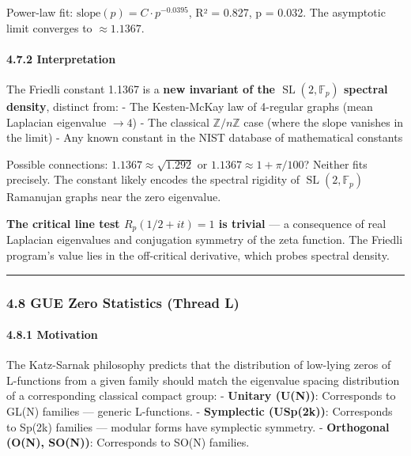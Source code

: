 \documentclass[
]{article}
\begin{document}
Power-law fit: \(\text{slope}(p) = C \cdot p^{-0.0395}\), R² = 0.827, p
= 0.032. The asymptotic limit converges to \(\approx 1.1367\).

\hypertarget{interpretation}{%
\paragraph{4.7.2 Interpretation}\label{interpretation}}

The Friedli constant 1.1367 is a \textbf{new invariant of the
\(\operatorname{SL}(2,\mathbb{F}_p)\) spectral density}, distinct from:
- The Kesten-McKay law of 4-regular graphs (mean Laplacian eigenvalue
\(\to 4\)) - The classical \(\mathbb{Z}/n\mathbb{Z}\) case (where the
slope vanishes in the limit) - Any known constant in the NIST database
of mathematical constants

Possible connections: \(1.1367 \approx \sqrt{1.292}\) or
\(1.1367 \approx 1 + \pi/100\)? Neither fits precisely. The constant
likely encodes the spectral rigidity of
\(\operatorname{SL}(2,\mathbb{F}_p)\) Ramanujan graphs near the zero
eigenvalue.

\textbf{The critical line test \(R_p(1/2+it)=1\) is trivial} --- a
consequence of real Laplacian eigenvalues and conjugation symmetry of
the zeta function. The Friedli program's value lies in the off-critical
derivative, which probes spectral density.

\begin{center}\rule{0.5\linewidth}{0.5pt}\end{center}

\hypertarget{gue-zero-statistics-thread-l}{%
\subsubsection{4.8 GUE Zero Statistics (Thread
L)}\label{gue-zero-statistics-thread-l}}

\hypertarget{motivation-1}{%
\paragraph{4.8.1 Motivation}\label{motivation-1}}

The Katz-Sarnak philosophy predicts that the distribution of low-lying
zeros of L-functions from a given family should match the eigenvalue
spacing distribution of a corresponding classical compact group: -
\textbf{Unitary (U(N))}: Corresponds to GL(N) families --- generic
L-functions. - \textbf{Symplectic (USp(2k))}: Corresponds to Sp(2k)
families --- modular forms have symplectic symmetry. -
\textbf{Orthogonal (O(N), SO(N))}: Corresponds to SO(N) families.
\end{document}
